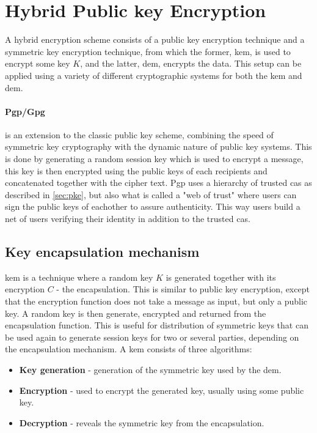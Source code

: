 \section{Hybrid Public key Encryption}\label{sec:hybrid}
A hybrid encryption scheme \cite{hybrid_enc} consists of a public key encryption technique and a symmetric key encryption technique, from which the former, \gls{kem}, is used to encrypt some key $K$, and the latter, \gls{dem}, encrypts the data. This setup can be applied using a variety of different cryptographic systems for both the \gls{kem} and \gls{dem}. 

\paragraph{Pgp/Gpg}\label{pgp}\cite{openpgp, koch2003gnu} is an extension to the classic public key scheme, combining the speed of symmetric key cryptography with the dynamic nature of public key systems. This is done by generating a random session key which is used to encrypt a message, this key is then encrypted using the public keys of each recipients and concatenated together with the cipher text. Pgp uses a hierarchy of trusted \glspl{ca} as described in \ref{sec:pke}, but also what is called a "web of trust" where users can sign the public keys of eachother to assure authenticity. This way users build a net of users verifying their identity in addition to the trusted \glspl{ca}.

\subsection{Key encapsulation mechanism}
\Gls{kem} \cite{kem_kurosawaP14} is a technique where a random key $K$ is generated together with its encryption $C$ - the encapsulation. This is similar to public key encryption, except that the encryption function does not take a message as input, but only a public key. A random key is then generate, encrypted and returned from the encapsulation function. This is useful for distribution of symmetric keys that can be used again to generate session keys for two or several parties, depending on the encapsulation mechanism. A \gls{kem} consists of three algorithms:
\begin{itemize}
\item \textbf{ Key generation } - generation of the symmetric key used by the \gls{dem}.
\item \textbf{ Encryption } - used to encrypt the generated key, usually using some public key.
\item \textbf{ Decryption } - reveals the symmetric key from the encapsulation.
\end{itemize}

